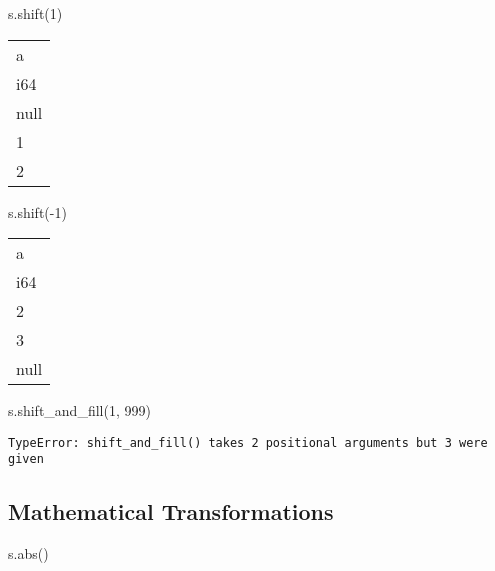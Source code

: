 \documentclass[
  letterpaper,
  DIV=11,
  numbers=noendperiod]{scrartcl}
\newenvironment{Shaded}{\begin{snugshade}}{\end{snugshade}}
\newcommand{\BuiltInTok}[1]{\textcolor[rgb]{0.00,0.23,0.31}{#1}}
\newcommand{\DecValTok}[1]{\textcolor[rgb]{0.68,0.00,0.00}{#1}}
\newcommand{\NormalTok}[1]{\textcolor[rgb]{0.00,0.23,0.31}{#1}}
\newcommand{\OperatorTok}[1]{\textcolor[rgb]{0.37,0.37,0.37}{#1}}
\begin{document}
\begin{Shaded}
\begin{Highlighting}[]
\NormalTok{s.shift(}\DecValTok{1}\NormalTok{)}
\end{Highlighting}
\end{Shaded}

\begin{longtable}[]{@{}l@{}}
\toprule()
a \\
i64 \\
\midrule()
\endhead
null \\
1 \\
2 \\
\bottomrule()
\end{longtable}

\begin{Shaded}
\begin{Highlighting}[]
\NormalTok{s.shift(}\OperatorTok{{-}}\DecValTok{1}\NormalTok{)}
\end{Highlighting}
\end{Shaded}

\begin{longtable}[]{@{}l@{}}
\toprule()
a \\
i64 \\
\midrule()
\endhead
2 \\
3 \\
null \\
\bottomrule()
\end{longtable}

\begin{Shaded}
\begin{Highlighting}[]
\NormalTok{s.shift\_and\_fill(}\DecValTok{1}\NormalTok{, }\DecValTok{999}\NormalTok{)}
\end{Highlighting}
\end{Shaded}

\begin{verbatim}
TypeError: shift_and_fill() takes 2 positional arguments but 3 were given
\end{verbatim}

\hypertarget{mathematical-transformations}{%
\subsection{Mathematical
Transformations}\label{mathematical-transformations}}

\begin{Shaded}
\begin{Highlighting}[]
\NormalTok{s.}\BuiltInTok{abs}\NormalTok{()}
\end{Highlighting}
\end{Shaded}
\end{document}
